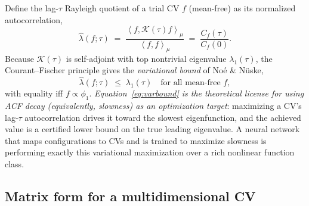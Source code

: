 \documentclass[11pt]{article}
\theoremstyle{plain}
\theoremstyle{definition}
\newcommand{\Kop}{\mathcal{K}}
\newcommand{\inner}[2]{\left\langle #1 , #2 \right\rangle_{\mu}}
\begin{document}
Define the lag-$\tau$ Rayleigh quotient of a trial CV $f$ (mean-free) as its
normalized autocorrelation,
\begin{equation}
\hat\lambda(f;\tau)\;=\;\frac{\inner{f}{\Kop(\tau)f}}{\inner{f}{f}}
\;=\;\frac{C_f(\tau)}{C_f(0)} .
\end{equation}
Because $\Kop(\tau)$ is self-adjoint with top nontrivial eigenvalue
$\lambda_1(\tau)$, the Courant--Fischer principle gives the \emph{variational bound}
of Noé \& Nüske,
\begin{equation}
\boxed{\;\hat\lambda(f;\tau)\;\le\;\lambda_1(\tau)\quad\text{for all mean-free }f,\;}
\label{eq:varbound}
\end{equation}
with equality iff $f\propto\phi_1$. \emph{Equation~\eqref{eq:varbound} is the
theoretical license for using ACF decay (equivalently, slowness) as an optimization
target}: maximizing a CV's lag-$\tau$ autocorrelation drives it toward the slowest
eigenfunction, and the achieved value is a certified lower bound on the true leading
eigenvalue. A neural network that maps configurations to CVs and is trained to
maximize slowness is performing exactly this variational maximization over a rich
nonlinear function class.

\subsection{Matrix form for a multidimensional CV}
\end{document}
